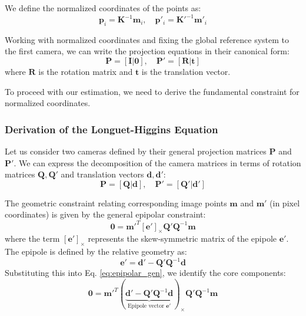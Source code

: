 \documentclass[11pt,a4paper]{article}
\theoremstyle{definition}
\theoremstyle{plain}
\theoremstyle{remark}
\begin{document}
We define the normalized coordinates of the points as:
\begin{equation} \label{eq:norm_coords_def}
    \mathbf{p}_i = \mathbf{K}^{-1} \mathbf{m}_i, \quad \mathbf{p}'_i = \mathbf{K}'^{-1} \mathbf{m}'_i
\end{equation}

Working with normalized coordinates and fixing the global reference system to the first camera, we can write the projection equations in their canonical form:
\begin{equation} \label{eq:canonical_cameras}
    \mathbf{P} = \mathbf{[I | 0]}, \quad \mathbf{P}' = \mathbf{[R | t]}
\end{equation}
where $\mathbf{R}$ is the rotation matrix and $\mathbf{t}$ is the translation vector.

To proceed with our estimation, we need to derive the fundamental constraint for normalized coordinates.

\subsubsection{Derivation of the Longuet-Higgins Equation}

Let us consider two cameras defined by their general projection matrices $\mathbf{P}$ and $\mathbf{P'}$. We can express the decomposition of the camera matrices in terms of rotation matrices $\mathbf{Q}, \mathbf{Q'}$ and translation vectors $\mathbf{d}, \mathbf{d'}$:
\begin{equation}
    \mathbf{P}=\mathbf{[Q | d]}, \quad \mathbf{P'}=\mathbf{[Q' | d']}
\end{equation}

The geometric constraint relating corresponding image points $\mathbf{m}$ and $\mathbf{m'}$ (in pixel coordinates) is given by the general epipolar constraint:
\begin{equation} \label{eq:epipolar_gen}
    \mathbf{0} = \mathbf{m'}^{T} \mathbf{[e']}_{\times} \mathbf{Q'} \mathbf{Q}^{-1} \mathbf{m}
\end{equation}
where the term $\mathbf{[e']}_{\times}$ represents the skew-symmetric matrix of the epipole $\mathbf{e'}$. The epipole is defined by the relative geometry as:
\begin{equation} \nonumber
    \mathbf{e'} =\mathbf{d'} - \mathbf{Q'} \mathbf{Q}^{-1} \mathbf{d}
\end{equation}
Substituting this into Eq. \eqref{eq:epipolar_gen}, we identify the core components:
\begin{equation} \nonumber
    \mathbf{0} = \mathbf{m}'^{T} (\underbrace{\mathbf{d'} - \mathbf{Q'} \mathbf{Q}^{-1} \mathbf{d}}_{\text{Epipole vector } \mathbf{e'}} )_{\times}\mathbf{Q'} \mathbf{Q}^{-1} \mathbf{m}
\end{equation}
\end{document}
